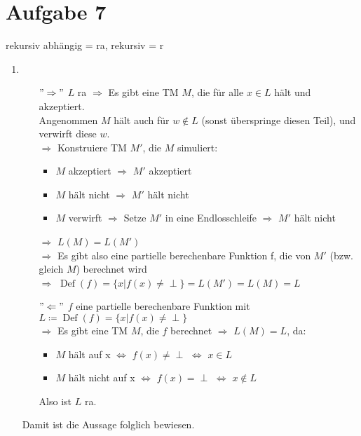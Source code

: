 \documentclass[a4paper,11pt]{scrartcl}
\begin{document}
	\section*{Aufgabe 7}
	rekursiv abhängig = ra, rekursiv = r
	\begin{enumerate}[label=\alph*)]
	\item	\begin{itemize}
			\item[$"\Rightarrow"$]
				$L$ ra $\Rightarrow$ Es gibt eine TM $M$, die für alle $x\in L$ hält und akzeptiert.\\
				Angenommen $M$ hält auch für $w\not\in L$ (sonst überspringe diesen Teil), und verwirft diese $w$.\\
				$\Rightarrow$ Konstruiere TM $M'$, die $M$ simuliert:
					\begin{itemize}
					\item $M$ akzeptiert $\Rightarrow$ $M'$ akzeptiert
					\item $M$ hält nicht $\Rightarrow$ $M'$ hält nicht
					\item $M$ verwirft $\Rightarrow$ Setze $M'$ in eine Endlosschleife $\Rightarrow$ $M'$ hält nicht
					\end{itemize}
				$\Rightarrow$ $L(M)=L(M')$\\
				$\Rightarrow$ Es gibt also eine partielle berechenbare Funktion f, die von $M'$ (bzw. gleich $M$) berechnet wird\\
				$\Rightarrow$ $\operatorname{Def}(f)=\{x \vert f(x) \neq \perp\}=L(M')=L(M)=L$
			
			\item[$"\Leftarrow"$]
				$f$ eine partielle berechenbare Funktion mit $L \coloneqq \operatorname{Def}(f)=\{x \vert f(x) \neq \perp\}$\\
				$\Rightarrow$ Es gibt eine TM $M$, die $f$ berechnet
				$\Rightarrow$ $L(M)=L$, da:
					\begin{itemize}
					\item $M$ hält auf x $\Leftrightarrow$ $f(x) \neq \perp$ $\Leftrightarrow$ $x\in L$
					\item $M$ hält nicht auf x $\Leftrightarrow$ $f(x) = \perp$ $\Leftrightarrow$ $x\not\in L$
					\end{itemize}
				Also ist $L$ ra.
			\end{itemize}
			Damit ist die Aussage folglich bewiesen.
			

\end{enumerate}
\end{document}
